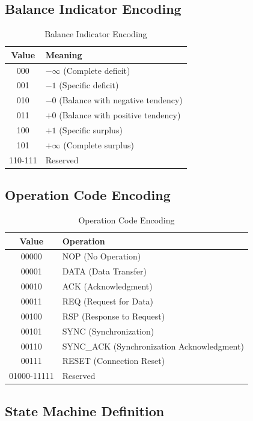 \documentclass[../OAE-SPEC-MAIN.tex]{subfiles}
\begin{document}
\subsection{Balance Indicator Encoding}

\begin{table}[h]
\centering
\begin{tabular}{|c|l|}
\hline
\textbf{Value} & \textbf{Meaning} \\
\hline
000 & $-\infty$ (Complete deficit) \\
001 & $-1$ (Specific deficit) \\
010 & $-0$ (Balance with negative tendency) \\
011 & $+0$ (Balance with positive tendency) \\
100 & $+1$ (Specific surplus) \\
101 & $+\infty$ (Complete surplus) \\
110-111 & Reserved \\
\hline
\end{tabular}
\caption{Balance Indicator Encoding}
\end{table}

\subsection{Operation Code Encoding}

\begin{table}[h]
\centering
\begin{tabular}{|c|l|}
\hline
\textbf{Value} & \textbf{Operation} \\
\hline
00000 & NOP (No Operation) \\
00001 & DATA (Data Transfer) \\
00010 & ACK (Acknowledgment) \\
00011 & REQ (Request for Data) \\
00100 & RSP (Response to Request) \\
00101 & SYNC (Synchronization) \\
00110 & SYNC\_ACK (Synchronization Acknowledgment) \\
00111 & RESET (Connection Reset) \\
01000-11111 & Reserved \\
\hline
\end{tabular}
\caption{Operation Code Encoding}
\end{table}

\subsection{State Machine Definition}
\end{document}
